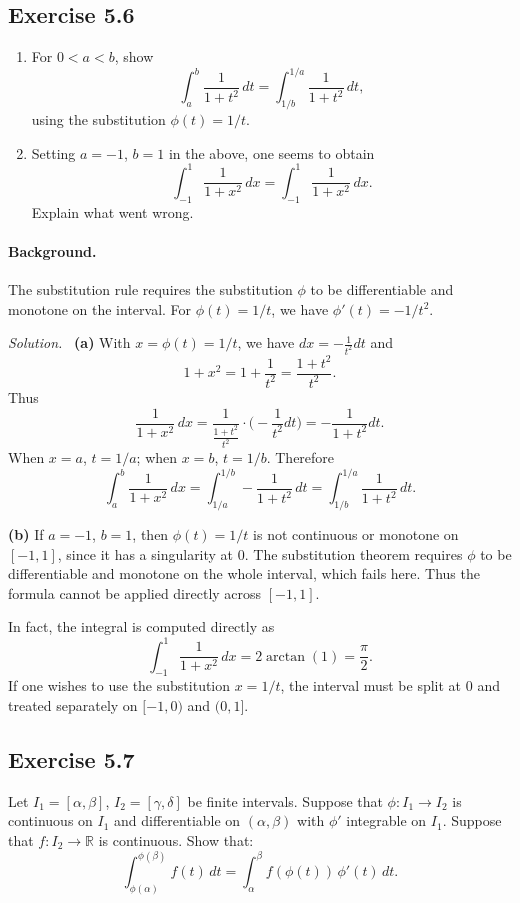 \documentclass[11pt,a4paper]{article}
\newenvironment{solution}{\par\noindent\textit{Solution.}\ }{\par\vspace{0.5em}}
\begin{document}
\subsection*{Exercise 5.6}
\begin{enumerate}[label=\alph*)]
	\item For $0<a<b$, show
	\[
	\int_a^b \frac{1}{1+t^2}\,dt=\int_{1/b}^{1/a}\frac{1}{1+t^2}\,dt,
	\]
	using the substitution $\phi(t)=1/t$.
	
	\item Setting $a=-1$, $b=1$ in the above, one seems to obtain
	\[
	\int_{-1}^1 \frac{1}{1+x^2}\,dx=\int_{-1}^1 \frac{1}{1+x^2}\,dx.
	\]
	Explain what went wrong.
\end{enumerate}

\paragraph{Background.}
The substitution rule requires the substitution $\phi$ to be differentiable and monotone on the interval. For $\phi(t)=1/t$, we have $\phi'(t)=-1/t^2$.

\begin{solution}
	\textbf{(a)}  
	With $x=\phi(t)=1/t$, we have $dx=-\tfrac{1}{t^2}dt$ and
	\[
	1+x^2=1+\frac{1}{t^2}=\frac{1+t^2}{t^2}.
	\]
	Thus
	\[
	\frac{1}{1+x^2}\,dx = \frac{1}{\tfrac{1+t^2}{t^2}}\cdot\Big(-\frac{1}{t^2}dt\Big) = -\frac{1}{1+t^2}dt.
	\]
	When $x=a$, $t=1/a$; when $x=b$, $t=1/b$. Therefore
	\[
	\int_a^b \frac{1}{1+x^2}\,dx=\int_{1/a}^{1/b}-\frac{1}{1+t^2}\,dt=\int_{1/b}^{1/a}\frac{1}{1+t^2}\,dt.
	\]
	
	\textbf{(b)}  
	If $a=-1$, $b=1$, then $\phi(t)=1/t$ is not continuous or monotone on $[-1,1]$, since it has a singularity at $0$. The substitution theorem requires $\phi$ to be differentiable and monotone on the whole interval, which fails here. Thus the formula cannot be applied directly across $[-1,1]$.
	
	In fact, the integral is computed directly as
	\[
	\int_{-1}^1 \frac{1}{1+x^2}\,dx = 2\arctan(1)=\frac{\pi}{2}.
	\]
	If one wishes to use the substitution $x=1/t$, the interval must be split at $0$ and treated separately on $[-1,0)$ and $(0,1]$.
\end{solution}

\subsection*{Exercise 5.7}
Let $I_1=[\alpha,\beta]$, $I_2=[\gamma,\delta]$ be finite intervals. Suppose that 
$\phi:I_1\to I_2$ is continuous on $I_1$ and differentiable on $(\alpha,\beta)$ with 
$\phi'$ integrable on $I_1$. Suppose that $f:I_2\to\mathbb{R}$ is continuous. 
Show that:
\[
\int_{\phi(\alpha)}^{\phi(\beta)} f(t)\,dt = \int_\alpha^\beta f(\phi(t))\,\phi'(t)\,dt.
\]
\end{document}
